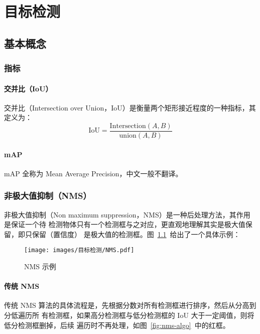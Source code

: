 \part{目标检测}
\chapter{基本概念}

\section{指标}

\subsection{交并比（IoU）}
交并比（Intersection over Union，IoU）是衡量两个矩形接近程度的一种指标，其定义为：
\begin{equation}
  \label{equ:IoU}
  \mathrm{IoU} = \frac{\mathrm{Intersection}(A, B)}{\mathrm{union}(A, B)}
\end{equation}

\subsection{mAP}
mAP 全称为 Mean Average Precision，中文一般不翻译。

\section{非极大值抑制（NMS）}

非极大值抑制（Non maximum suppression，NMS）是一种后处理方法，其作用是保证一个待
检测物体只有一个检测框与之对应，更直观地理解其实是极大值保留，即只保留（置信度）
是极大值的检测框。图~\ref{fig:nms}~给出了一个具体示例：

\begin{figure}[ht]
  \centering
  \texttt{[image: images/目标检测/NMS.pdf]}
  \caption{NMS 示例}
  \label{fig:nms}
\end{figure}

\subsection{传统 NMS}

传统 NMS 算法的具体流程是，先根据分数对所有检测框进行排序，然后从分高到分低遍历所
有检测框，如果高分检测框与低分检测框的 IoU 大于一定阈值，则将低分检测框删掉，后续
遍历时不再处理，如图~\ref{fig:nms-algo}~中的红框。

